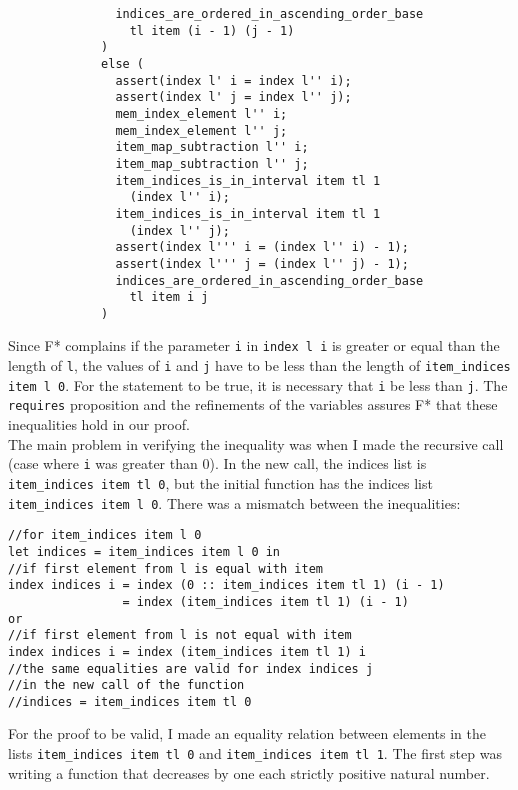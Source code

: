 \begin{verbatim}
               indices_are_ordered_in_ascending_order_base
                 tl item (i - 1) (j - 1)
             )
             else (
               assert(index l' i = index l'' i);
               assert(index l' j = index l'' j);
               mem_index_element l'' i;
               mem_index_element l'' j;
               item_map_subtraction l'' i;
               item_map_subtraction l'' j;
               item_indices_is_in_interval item tl 1 
                 (index l'' i);
               item_indices_is_in_interval item tl 1 
                 (index l'' j);
               assert(index l''' i = (index l'' i) - 1);
               assert(index l''' j = (index l'' j) - 1);
               indices_are_ordered_in_ascending_order_base 
                 tl item i j
             )             
\end{verbatim}

Since F* complains if the parameter \texttt{i} in \texttt{index l i} is greater or equal than the length of \texttt{l}, the values of \texttt{i} and \texttt{j} have to be less than the length of \texttt{item\_indices item l 0}. For the statement to be true, it is necessary that \texttt{i} be less than \texttt{j}. The \texttt{requires} proposition and the refinements of the variables assures F* that these inequalities hold in our proof. \\
\indent The main problem in verifying the inequality was when I made the recursive call (case where \texttt{i} was greater than \(0\)). In the new call, the indices list is \texttt{item\_indices item tl 0}, but the initial function has the indices list \texttt{item\_indices item l 0}. There was a mismatch between the inequalities: 

\begin{verbatim}
//for item_indices item l 0
let indices = item_indices item l 0 in 
//if first element from l is equal with item
index indices i = index (0 :: item_indices item tl 1) (i - 1)
                = index (item_indices item tl 1) (i - 1) 
or
//if first element from l is not equal with item
index indices i = index (item_indices item tl 1) i
//the same equalities are valid for index indices j
//in the new call of the function 
//indices = item_indices item tl 0
\end{verbatim}

For the proof to be valid, I made an equality relation between elements in the lists \texttt{item\_indices item tl 0} and \texttt{item\_indices item tl 1}. The first step was writing a function that decreases by one each strictly positive natural number.

